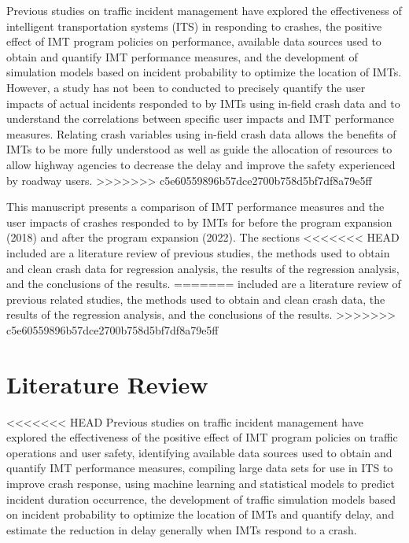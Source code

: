 \documentclass[
  letterpaper,
  authoryear]{elsarticle}
\begin{document}
Previous studies on traffic incident management have explored the
effectiveness of intelligent transportation systems (ITS) in responding
to crashes, the positive effect of IMT program policies on performance,
available data sources used to obtain and quantify IMT performance
measures, and the development of simulation models based on incident
probability to optimize the location of IMTs. However, a study has not
been to conducted to precisely quantify the user impacts of actual
incidents responded to by IMTs using in-field crash data and to
understand the correlations between specific user impacts and IMT
performance measures. Relating crash variables using in-field crash data
allows the benefits of IMTs to be more fully understood as well as guide
the allocation of resources to allow highway agencies to decrease the
delay and improve the safety experienced by roadway users.
>>>>>>> c5e60559896b57dce2700b758d5bf7df8a79e5ff

This manuscript presents a comparison of IMT performance measures and
the user impacts of crashes responded to by IMTs for before the program
expansion (2018) and after the program expansion (2022). The sections
<<<<<<< HEAD
included are a literature review of previous studies, the methods used
to obtain and clean crash data for regression analysis, the results of
the regression analysis, and the conclusions of the results.
=======
included are a literature review of previous related studies, the
methods used to obtain and clean crash data, the results of the
regression analysis, and the conclusions of the results.
>>>>>>> c5e60559896b57dce2700b758d5bf7df8a79e5ff


\section{Literature Review}\label{literature-review}

<<<<<<< HEAD
Previous studies on traffic incident management have explored the
effectiveness of the positive effect of IMT program policies on traffic
operations and user safety, identifying available data sources used to
obtain and quantify IMT performance measures, compiling large data sets
for use in ITS to improve crash response, using machine learning and
statistical models to predict incident duration occurrence, the
development of traffic simulation models based on incident probability
to optimize the location of IMTs and quantify delay, and estimate the
reduction in delay generally when IMTs respond to a crash.
\end{document}
